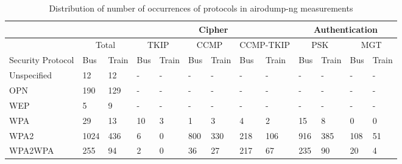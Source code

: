 \documentclass[letterpaper, 10 pt, conference]{ieeeconf}  %
\begin{document}
\begin{center}
  \begin{table}
   \centering
    \begin{tabular}{ |l|l|l|l|l|l|l|l|l|l|l|l|l| }
    \hline    
    {} & \multicolumn{2}{|c|}{} & \multicolumn{6}{|c|}{Cipher} & \multicolumn{4}{|c|}{Authentication} \\ \hline
    {} & \multicolumn{2}{|c|}{Total} & \multicolumn{2}{|c|}{TKIP} & \multicolumn{2}{|c|}{CCMP} & \multicolumn{2}{|c|}{CCMP-TKIP} & \multicolumn{2}{|c|}{PSK} & \multicolumn{2}{|c|}{MGT} \\ \hline
    Security Protocol & Bus & Train& Bus & Train & Bus & Train & Bus & Train & Bus & Train & Bus & Train \\ \hline
    Unspecified & 12 & 12 & - & - & - & - & - & - & - & - & - & - \\ \hline
    OPN & 190 & 129 & - & - & - & - & - & - & - & - & - & - \\ \hline
    WEP & 5 & 9 & - & - & - & - & - & - & - & - & - & - \\ \hline    
    WPA & 29 & 13 & 10 & 3 & 1 & 3 & 4 & 2 & 15 & 8 & 0 & 0 \\ \hline
    WPA2 & 1024 & 436 & 6 & 0 & 800 & 330 & 218 & 106 & 916 & 385 & 108 & 51 \\ \hline
    WPA2WPA & 255 & 94 & 2 & 0 & 36 & 27 & 217 & 67 & 235 & 90 & 20 & 4 \\ \hline    
    \end{tabular}
    \caption{Distribution of number of occurrences of protocols in airodump-ng measurements}
    \label{tab:measurements}
  \end{table}
\end{center}


\addtolength{\textheight}{-12cm}   %












\end{document}
